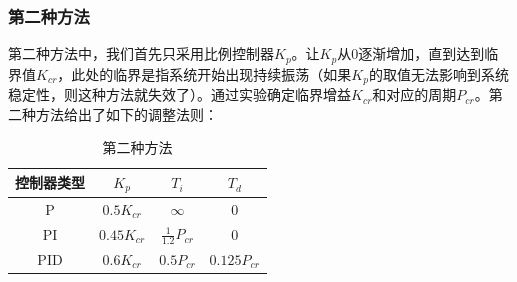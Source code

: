 \subsubsection{第二种方法}

第二种方法中，我们首先只采用比例控制器$K_p$。让$K_p$从$0$逐渐增加，直到达到临界值$K_{cr}$，此处的临界是指系统开始出现持续振荡（如果$K_p$的取值无法影响到系统稳定性，则这种方法就失效了）。通过实验确定临界增益$K_{cr}$和对应的周期$P_{cr}$。第二种方法给出了如下的调整法则：

\begin{table}[!h]
	\centering
	\caption{第二种方法}
	\begin{tabular}{|c|c|c|c|}
		\hline
		控制器类型	&	$K_p$	&	$T_i$	&	$T_d$\\\hline
		P	&	$0.5K_{cr}$	&	$\infty$	&	$0$	\\\hline
		PI	&	$0.45K_{cr}$	&	$\frac{1}{1.2}P_{cr}$	&	$0$	\\\hline
		PID	&	$0.6K_{cr}$	&	$0.5P_{cr}$	&	$0.125P_{cr}$	\\\hline
	\end{tabular}
\end{table}
